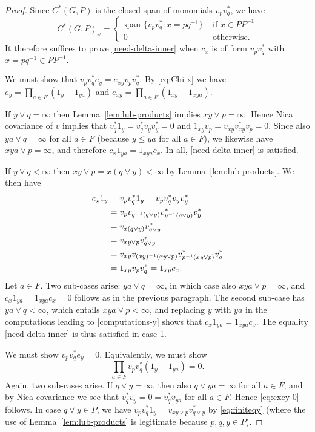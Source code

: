 \documentclass[12pt]{amsart}
\theoremstyle{plain}
\theoremstyle{remark}
\theoremstyle{definition}
\numberwithin{equation}{section}
\theoremstyle{plain}
\theoremstyle{definition}
\theoremstyle{remark}
\begin{document}
\begin{proof} Since $C^*(G, P)$ is the closed span of monomials $v_pv_q^*$, we have
\begin{equation}\label{eq:spectral-subsp-full}
C^*(G, P)_x=\begin{cases}
{\operatorname{\overline{span\!}\,\,}}\{v_pv_q^*: x=pq^{-1}\}&\text{ if }x\in PP^{-1}\\
0&\text{ otherwise}.
\end{cases}
\end{equation}
It therefore suffices to prove
\eqref{need-delta-inner} when $c_x$ is of form $v_pv_q^*$ with $x=pq^{-1}\in PP^{-1}.$

\smallskip
{} We must show that $v_pv_q^*e_y=e_{xy}v_pv_q^*$. By
\eqref{eq:Chi-x} we have $e_y=\prod_{a\in F}(1_y-1_{ya})$ and
$e_{xy}=\prod_{a\in F}(1_{xy}-1_{xya})$.

If $y\vee q=\infty$ then Lemma~\ref{lem:lub-products} implies $xy\vee p=\infty$. Hence
Nica covariance of $v$ implies that $v_q^*1_y=v_q^*v_yv_y^*=0$
and $1_{xy}v_p=v_{xy}v_{xy}^*v_p=0$. Since  also $ya\vee q=\infty$ for all $a\in F$ (because
$y\leq ya$ for all $a\in F$), we likewise have $xya\vee p=\infty$, and therefore
$c_x1_{ya}=1_{xya}c_x$. In all, \eqref{need-delta-inner} is satisfied.

If $y\vee q<\infty$ then $xy\vee p=x(q\vee y)<\infty$ by Lemma~\ref{lem:lub-products}.
We then have
\begin{align}
c_x1_y&=v_pv_q^*1_y
=v_pv_q^*v_yv_y^*\notag \\
&=v_pv_{q^{-1}(q\vee y)}v^*_{y^{-1}(q\vee y)}v_y^*\notag\\
&=v_{x(q\vee y)}v^*_{q\vee y}\notag\\
&=v_{xy\vee p}v^*_{q\vee y}\label{eq:finiteqy}\\
&=v_{xy}v_{(xy)^{-1}(xy\vee p)}v _{p^{-1}(xy\vee p)}^*v^*_q\notag\\
&=1_{xy}v_pv_q^*=1_{xy}c_x.\label{computations-y}
\end{align}
Let $a\in F$. Two sub-cases arise: $ya\vee q=\infty$, in which case also $xya\vee p=\infty$, and
$c_x1_{ya}=1_{xya}c_x=0$ follows as in the previous paragraph. The second sub-case
has $ya\vee q<\infty$, which entails $xya\vee p<\infty$, and replacing $y$ with $ya$ in the computations leading to \eqref{computations-y} shows that $c_x1_{ya}=1_{xya}c_x$. The
equality \eqref{need-delta-inner} is thus satisfied in case 1.

\smallskip
{} We must show $v_pv_q^*e_y=0$. Equivalently,
we must show
\begin{equation}\label{eq:cxey-0}
\prod_{a\in F}v_pv_q^*(1_y-1_{ya})=0.
\end{equation}
Again, two sub-cases arise. If $q\vee y=\infty$, then also $q\vee ya=\infty$ for all
$a\in F$, and by Nica covariance we see that $v_q^*v_y=0=v_q^*v_{ya}$ for all $a\in F$.
Hence \eqref{eq:cxey-0} follows. In case $q\vee y\in P$, we have $v_pv_q^*1_y=
v_{xy\vee p}v^*_{q\vee y}$ by \eqref{eq:finiteqy} (where the use of
Lemma~\ref{lem:lub-products} is legitimate because $p,q,y\in P$).


\end{proof}
\end{document}
